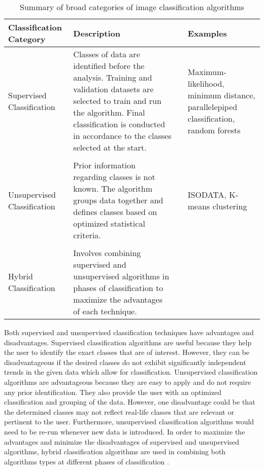 \begin{table}[H]
	\centering
	\small
	\def\arraystretch{1.3}
	\begin{threeparttable}
		\caption{Summary of broad categories of image classification algorithms \citep{al2013image}}
		\label{table8}
		\begin{tabular}{L{5cm} p{5.7cm} L{0.2cm} L{3.3cm}}
			\toprule[0.25mm]
			Classification Category & Description && Examples\\
			\midrule[0.35mm]
			Supervised Classification   & Classes of data are identified before the analysis. Training and validation datasets are selected to train and run the algorithm. Final classification is conducted in accordance to the classes selected at the start.  && Maximum-likelihood, minimum distance, parallelepiped classification, random forests \\\\[-0.3cm]
			Unsupervised Classification    & Prior information regarding classes is not known. The algorithm groups data together and defines classes based on optimized statistical criteria.   & & ISODATA, K-means clustering \\\\[-0.3cm]
			Hybrid Classification  & Involves combining supervised and unsupervised algorithms in phases of classification to maximize the advantages of each technique.   & & \textbf{\textemdash} \\
			\bottomrule[0.25mm]
		\end{tabular}
	\end{threeparttable}
\end{table}

\justify
Both supervised and unsupervised classification techniques have advantages and disadvantages. Supervised classification algorithms are useful because they help the user to identify the exact classes that are of interest. However, they can be disadvantageous if the desired classes do not exhibit significantly independent trends in the given data which allow for classification. Unsupervised classification algorithms are advantageous because they are easy to apply and do not require any prior identification. They also provide the user with an optimized classification and grouping of the data. However, one disadvantage could be that the determined classes may not reflect real-life classes that are relevant or pertinent to the user. Furthermore, unsupervised classification algorithms would need to be re-run whenever new data is introduced. In order to maximize the advantages and minimize the disadvantages of supervised and unsupervised algorithms, hybrid classification algorithms are used in combining both algorithms types at different phases of classification \citep{al2013image}.

